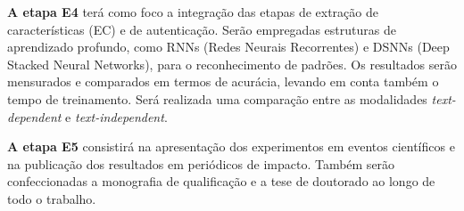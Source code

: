\documentclass[a4paper,12pt,openright,oneside]{book}
\newenvironment{myenv}[1]
  {\begin{spacing}{#1}}
  {\end{spacing}}
\begin{document}
\begin{myenv}{1.5}
			\par \textbf{A etapa E4} terá como foco a integração das etapas de extração de características (EC) e de autenticação. Serão empregadas estruturas de aprendizado profundo, como RNNs (Redes Neurais Recorrentes) e DSNNs (Deep Stacked Neural Networks), para o reconhecimento de padrões. Os resultados serão mensurados e comparados em termos de acurácia, levando em conta também o tempo de treinamento. Será realizada uma comparação entre as modalidades \textit{text-dependent} e \textit{text-independent}.\newline
			
			\par \textbf{A etapa E5} consistirá na apresentação dos experimentos em eventos científicos e na publicação dos resultados em periódicos de impacto. Também serão confeccionadas a monografia de qualificação e a tese de doutorado ao longo de todo o trabalho.
				
			\begin{table}[htbp]
				\label{tb:cronograma}
				\centering
				\renewcommand{\arraystretch}{1.5}
				

\end{table}
\end{myenv}
\end{document}
